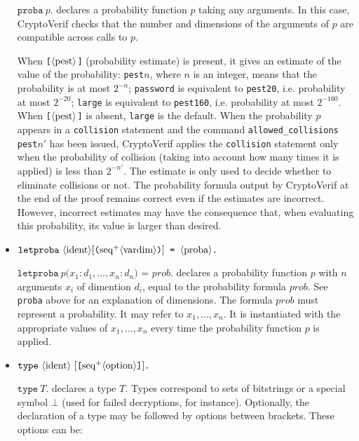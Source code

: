 \begin{itemize}
$\texttt{proba}\ p\texttt{.}$ declares a probability function $p$ taking any arguments. In this case, CryptoVerif checks that the number and dimensions of the arguments of $p$ are compatible across calls to $p$.

When \texttt{[$\langle\textrm{pest}\rangle$]} ({\sc p}robability {\sc est}imate) is present, 
it gives an estimate of the value of the probability:
\texttt{pest$n$}, where $n$ is an integer, means that the probability is at most $2^{-n}$;
\texttt{password} is equivalent to \texttt{pest20}, i.e. probability at most $2^{-20}$;
\texttt{large} is equivalent to \texttt{pest160}, i.e. probability at most $2^{-160}$.
When \texttt{[$\langle\textrm{pest}\rangle$]} is absent, \texttt{large} is the default.
%
When the probability $p$ appears in a \texttt{collision} statement and
the command \texttt{allowed\_collisions pest$n'$} has been issued,
CryptoVerif applies the \texttt{collision} statement only when the
probability of collision (taking into account how many times it is
applied) is less than $2^{-n'}$.
The estimate is only used to decide whether to eliminate collisions or not.
The probability formula output by CryptoVerif at the end of the proof
remains correct even if the estimates are incorrect. However,
incorrect estimates may have the consequence that, when evaluating
this probability, its value is larger than desired.

\item $\texttt{letproba}\ \nonterm{ident}[\texttt{(}\neseq{vardim}\texttt{)}] \texttt{ = }\nonterm{proba}\texttt{.}$

$\texttt{letproba}\ p\texttt{(}x_1:d_1, \dots, x_n:d_n\texttt{) = }\mathit{prob}\texttt{.}$ declares a probability function $p$ with $n$ arguments $x_i$ of dimention $d_i$, equal to the probability formula $\mathit{prob}$. See \texttt{proba} above for an explanation of dimensions. The formula $\mathit{prob}$ must represent a probability. It may refer to $x_1, \dots, x_n$. It is instantiated with the appropriate values of $x_1, \dots, x_n$ every time the probability function $p$ is applied.

\item $\texttt{type}\ \nonterm{ident}\ [\texttt{[}\neseq{option}\texttt{]}]\texttt{.}$

$\texttt{type}\ T\texttt{.}$ declares a type $T$. Types correspond to sets
of bitstrings or a special symbol $\bot$ (used for failed decryptions, 
for instance). Optionally, the declaration of a type may be followed by options
between brackets. These options can be:
\begin{itemize}


\end{itemize}
\end{itemize}
